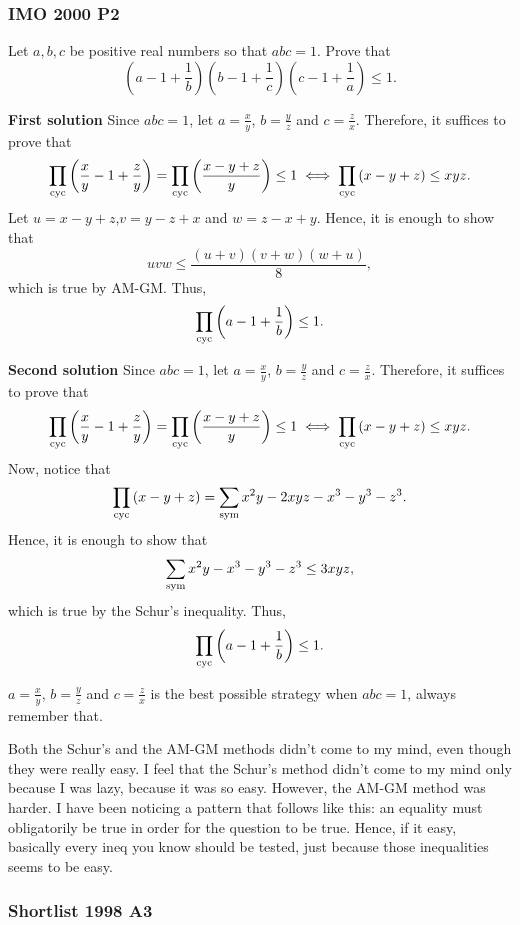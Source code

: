 \clearpage

\subsubsection{IMO 2000 P2}
\begin{problem}
Let $ a, b, c$ be positive real numbers so that $ abc = 1$. Prove that
\[
	\left( a - 1 + \frac 1b \right) \left( b - 1 + \frac 1c \right) \left( c - 1 + \frac 1a \right) \leq 1.
\]
\end{problem}

\textbf{\textcolor{color2}{First solution}} Since $abc=1$, let $a=\frac{x}{y}$, $b=\frac{y}{z}$ and $c=\frac{z}{x}$. Therefore, it suffices to prove that
\[
	\prod_{\text{cyc}} \left(\frac{x}{y}-1+\frac{z}{y}\right) = \prod_{\text{cyc}} \left(\frac{x-y+z}{y}\right) \le 1 \iff
	\prod_{\text{cyc}} \left(x-y+z\right) \le xyz.
\]
Let $u=x-y+z$,$v=y-z+x$ and $w=z-x+y$. Hence, it is enough to show that
\[
	uvw \le \frac{(u+v)(v+w)(w+u)}{8},
\]
which is true by AM-GM. Thus,
\[
	\prod_{\text{cyc}} \left( a - 1 + \frac 1b \right) \le 1.
\]

\textbf{\textcolor{color2}{Second solution}} Since $abc=1$, let $a=\frac{x}{y}$, $b=\frac{y}{z}$ and $c=\frac{z}{x}$. Therefore, it suffices to prove that
\[
	\prod_{\text{cyc}} \left(\frac{x}{y}-1+\frac{z}{y}\right) = \prod_{\text{cyc}} \left(\frac{x-y+z}{y}\right) \le 1 \iff
	\prod_{\text{cyc}} \left(x-y+z\right) \le xyz.
\]
Now, notice that
\[
	\prod_{\text{cyc}} \left(x-y+z\right) = \sum_{\text{sym}} x^2y -2xyz -x^3-y^3-z^3.
\]
Hence, it is enough to show that
\[
	\sum_{\text{sym}} x^2y -x^3-y^3-z^3 \le 3xyz,
\]
which is true by the Schur's inequality. Thus,
\[
	\prod_{\text{cyc}} \left( a - 1 + \frac 1b \right) \le 1.
\]

\begin{insight}
	$a=\frac{x}{y}$, $b=\frac{y}{z}$ and $c=\frac{z}{x}$ is the best possible strategy when $abc=1$, always remember that.

	Both the Schur's and the AM-GM methods didn't come to my mind, even though they were really easy. I feel that the
	Schur's method didn't come to my mind only because I was lazy, because it was so easy. However, the AM-GM method was
	harder. I have been noticing a pattern that follows like this: an equality must obligatorily be true in order for the
	question to be true. Hence, if it easy, basically every ineq you know should be tested, just because those inequalities
	seems to be easy.
\end{insight}

\clearpage

\subsubsection{Shortlist 1998 A3}

